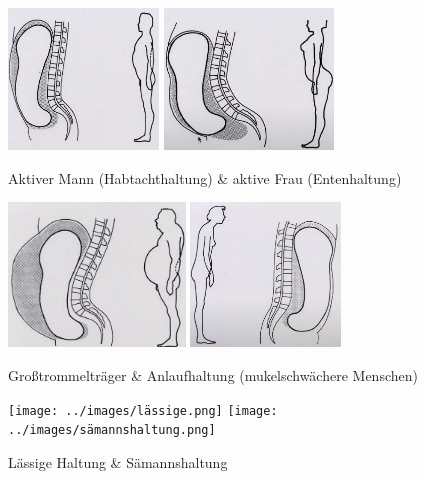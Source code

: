 \documentclass[xcolor=dvipsnames]{beamer}
\begin{document}
\begin{frame}[allowframebreaks]
        \begin{figure}
            \includegraphics[width=4cm]{../images/habtachthaltung.png}
            \includegraphics[width=4.5cm]{../images/entenhaltung.png}
            \caption{Aktiver Mann (Habtachthaltung) \& aktive Frau (Entenhaltung)}
        \end{figure}

        \begin{figure}
            \includegraphics[width=4.7cm]{../images/großtrommelträger.png}
            \includegraphics[width=4cm]{../images/anlaufhaltung.png}
            \caption{Großtrommelträger \& Anlaufhaltung (mukelschwächere Menschen)}
        \end{figure}

        \begin{figure}
            \texttt{[image: ../images/lässige.png]}
            \texttt{[image: ../images/sämannshaltung.png]}
            \caption{Lässige Haltung \& Sämannshaltung}
        \end{figure}

    \end{frame}
\end{document}
